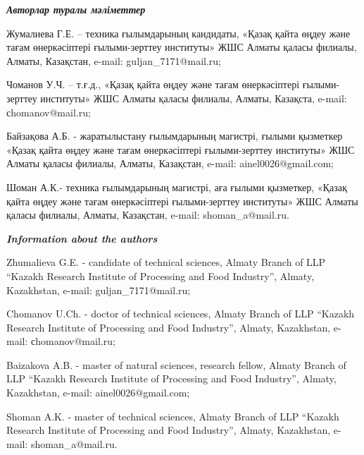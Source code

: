 \begin{info}
\emph{{\bfseries Авторлар туралы мәліметтер}}

Жумалиева Г.Е. -- техника ғылымдарының кандидаты, «Қазақ қайта өңдеу
және тағам өнеркәсіптері ғылыми-зерттеу институты» ЖШС Алматы қаласы
филиалы, Алматы, Казақстан, e-mail: guljan\_7171@mail.ru;

Чоманов У.Ч. -- т.ғ.д., «Қазақ қайта өңдеу және тағам өнеркәсіптері
ғылыми-зерттеу институты» ЖШС Алматы қаласы филиалы, Алматы, Казақста,
e-mail: сhomanov@mail.ru;

Байзақова А.Б. - жаратылыстану ғылымдарының магистрі, ғылыми қызметкер
«Қазақ қайта өңдеу және тағам өнеркәсіптері ғылыми-зерттеу институты»
ЖШС Алматы қаласы филиалы, Алматы, Казақстан, e-mail:
ainel0026@gmail.com;

Шоман А.К.- техника ғылымдарының магистрі, аға ғылыми қызметкер,
«Қазақ қайта өңдеу және тағам өнеркәсіптері ғылыми-зерттеу институты»
ЖШС Алматы қаласы филиалы, Алматы, Казақстан, e-mail:
shoman\_a@mail.ru.

\emph{{\bfseries Information about the authors}}

Zhumalieva G.E. - candidate of technical sciences, Almaty Branch of
LLP ``Kazakh Research Institute of Processing and Food Industry'',
Almaty, Kazakhstan, e-mail: guljan\_7171@mail.ru;

Chomanov U.Ch. - doctor of technical sciences, Almaty Branch of LLP
``Kazakh Research Institute of Processing and Food Industry'', Almaty,
Kazakhstan, e-mail: сhomanov@mail.ru;

Baizakova A.B. - master of natural sciences, research fellow, Almaty
Branch of LLP ``Kazakh Research Institute of Processing and Food
Industry'', Almaty, Kazakhstan, e-mail: ainel0026@gmail.com;

Shoman A.K. - master of technical sciences, Almaty Branch of LLP
``Kazakh Research Institute of Processing and Food Industry'', Almaty,
Kazakhstan, e-mail: shoman\_a@mail.ru.
\end{info}
